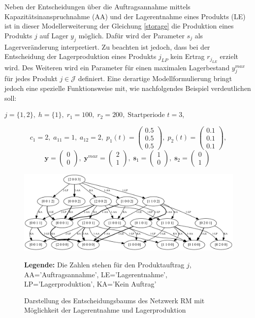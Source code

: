Neben der Entscheidungen über die Auftragsannahme mittels Kapazitätsinanspruchnahme (AA) und der Lagerentnahme eines Produkts (LE) ist in dieser Modellerweiterung der Gleichung \eqref{storage} die Produktion eines Produkts $j$ auf Lager $y_{j}$ möglich. Dafür wird der Parameter $s_{j}$ als Lagerveränderung interpretiert. Zu beachten ist jedoch, dass bei der Entscheidung der Lagerproduktion eines Produkts $j_{LP}$ kein Ertrag $r_{j_{LE}}$ erzielt wird. Des Weiteren wird ein Parameter für einen maximalen Lagerbestand $y_{j}^{max}$ für jedes Produkt $j\in\mathcal{J}$ definiert. Eine derartige Modellformulierung bringt jedoch eine spezielle Funktionsweise mit, wie nachfolgendes Beispiel verdeutlichen soll:
\begin{center}
$j = \{1, 2\}, \; h = \{1\}, \; r_{1} = 100, \; r_{2} = 200, \; \text{Startperiode } t=3$,
\end{center}
\[
    c_{1}=2, \;
    a_{11}=1, \;
     a_{12}=2, \;
     p_{1}(t)=\begin{pmatrix} 0.5\\ 0.5\\ 0.5  \end{pmatrix}, \;
     p_{2}(t)=\begin{pmatrix} 0.1\\ 0.1\\ 0.1  \end{pmatrix},
  \]
  \[
    \textbf{y}=\begin{pmatrix} 0 \\ 0 \end{pmatrix}, \;
    \textbf{y}^{max}=\begin{pmatrix} 2 \\ 1 \end{pmatrix}, \;
    \textbf{s}_1=\begin{pmatrix} 1 \\ 0 \end{pmatrix}, \;
     \textbf{s}_2=\begin{pmatrix} 0 \\ 1 \end{pmatrix} \;
  \]
\begin{figure}[h!]
  \begin{center}
    \includegraphics[width=130mm]{Bilder/Beispiel4.pdf}
    \caption{Darstellung des Entscheidungsbaums des Netzwerk RM mit Möglichkeit der Lagerentnahme und Lagerproduktion}  \label{B4}
    {\footnotesize \textbf{Legende:} Die Zahlen stehen für den Produktauftrag $j$, AA='Auftragsannahme', LE='Lagerentnahme', LP='Lagerproduktion', KA='Kein Auftrag'} 
  \end{center}
\end{figure}

